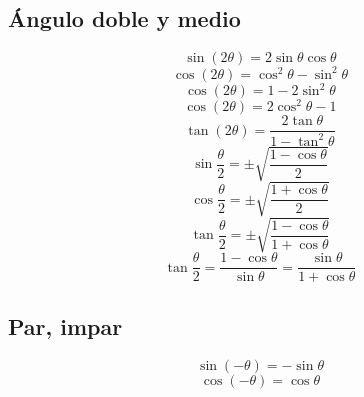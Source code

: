 \documentclass[
	12pt, %
	fleqn, %
	a4paper, %
	oneside, %
]{LegrandOrangeBook}
\begin{document}
\subsection{Ángulo doble y medio}
\begin{equation}
\sin(2\theta)=2\sin\theta\cos\theta
\end{equation}
\begin{equation}
\cos(2\theta)=\cos^2\theta-\sin^2\theta
\end{equation}
\begin{equation}
\cos(2\theta)=1-2\sin^2\theta
\end{equation}
\begin{equation}
\cos(2\theta)=2\cos^2\theta-1
\end{equation}
\begin{equation}
\tan(2\theta)=\frac{2\tan\theta}{1-\tan^2\theta}
\end{equation}
\begin{equation}
\sin\frac{\theta}{2}=\pm\sqrt{\frac{1-\cos\theta}{2}}
\end{equation}
\begin{equation}
\cos\frac{\theta}{2}=\pm\sqrt{\frac{1+\cos\theta}{2}}
\end{equation}
\begin{equation}
\tan\frac{\theta}{2}=\pm\sqrt{\frac{1-\cos\theta}{1+\cos\theta}}
\end{equation}
\begin{equation}
\tan\frac{\theta}{2}=\frac{1-\cos\theta}{\sin\theta}=\frac{\sin\theta}{1+\cos\theta}
\end{equation}
\subsection{Par, impar}
\begin{equation}
\sin(-\theta)=-\sin\theta
\end{equation}
\begin{equation}
\cos(-\theta)=\cos\theta
\end{equation}
\end{document}
